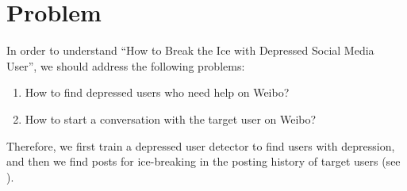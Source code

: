 \section{Problem}
\label{sec:problem}
In order to understand ``How to Break the Ice with Depressed Social Media User'', we should address the following problems: 
\begin{enumerate}
	\item How to find depressed users who need help on Weibo?
	\item How to start a conversation with the target user on Weibo?
\end{enumerate}

Therefore, we first train a depressed user detector to find users with depression, and then we find posts for ice-breaking in the posting history of target users (see ).


